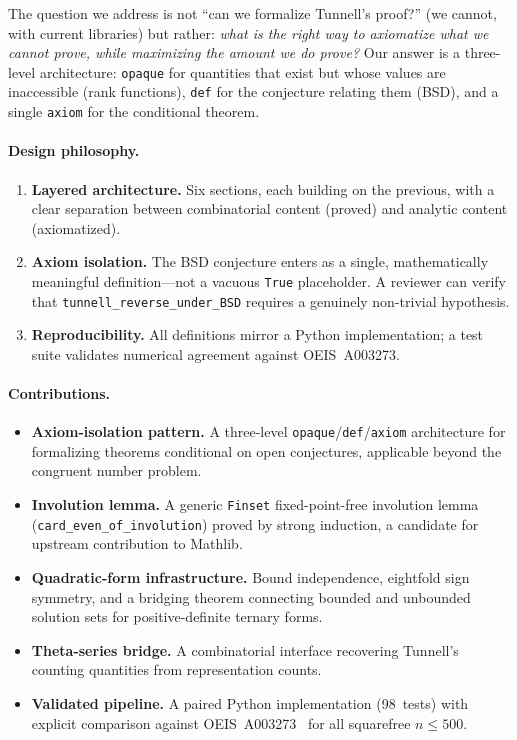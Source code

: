 \documentclass[11pt,a4paper]{article}
\theoremstyle{definition}
\newcommand{\lean}[1]{\texttt{#1}}
\begin{document}
The question we address is not ``can we formalize Tunnell's proof?''
(we cannot, with current libraries) but rather: \emph{what is the
right way to axiomatize what we cannot prove, while maximizing the
amount we do prove?}  Our answer is a three-level architecture:
\lean{opaque} for quantities that exist but whose values are
inaccessible (rank functions), \lean{def} for the conjecture
relating them (BSD), and a single \lean{axiom} for the conditional
theorem.

\paragraph{Design philosophy.}
\begin{enumerate}[nosep]
  \item \textbf{Layered architecture.}  Six sections, each building
    on the previous, with a clear separation between combinatorial
    content (proved) and analytic content (axiomatized).
  \item \textbf{Axiom isolation.}  The BSD conjecture enters as a
    single, mathematically meaningful definition---not a vacuous
    \lean{True} placeholder.  A reviewer can verify that
    \lean{tunnell\_reverse\_under\_BSD} requires a genuinely
    non-trivial hypothesis.
  \item \textbf{Reproducibility.}  All definitions mirror a Python
    implementation; a test suite validates numerical agreement
    against OEIS~A003273.
\end{enumerate}

\paragraph{Contributions.}
\begin{itemize}[nosep]
  \item \textbf{Axiom-isolation pattern.}  A three-level
    \lean{opaque}/\lean{def}/\lean{axiom} architecture for
    formalizing theorems conditional on open conjectures, applicable
    beyond the congruent number problem.
  \item \textbf{Involution lemma.}  A generic \lean{Finset}
    fixed-point-free involution lemma
    (\lean{card\_even\_of\_involution}) proved by strong induction,
    a candidate for upstream contribution to Mathlib.
  \item \textbf{Quadratic-form infrastructure.}  Bound independence,
    eightfold sign symmetry, and a bridging theorem connecting
    bounded and unbounded solution sets for positive-definite
    ternary forms.
  \item \textbf{Theta-series bridge.}  A combinatorial interface
    recovering Tunnell's counting quantities from representation
    counts.
  \item \textbf{Validated pipeline.}  A paired Python implementation
    (98~tests) with explicit comparison against
    OEIS~A003273~\cite{OEIS_A003273} for all squarefree $n \le 500$.
\end{itemize}
\end{document}
